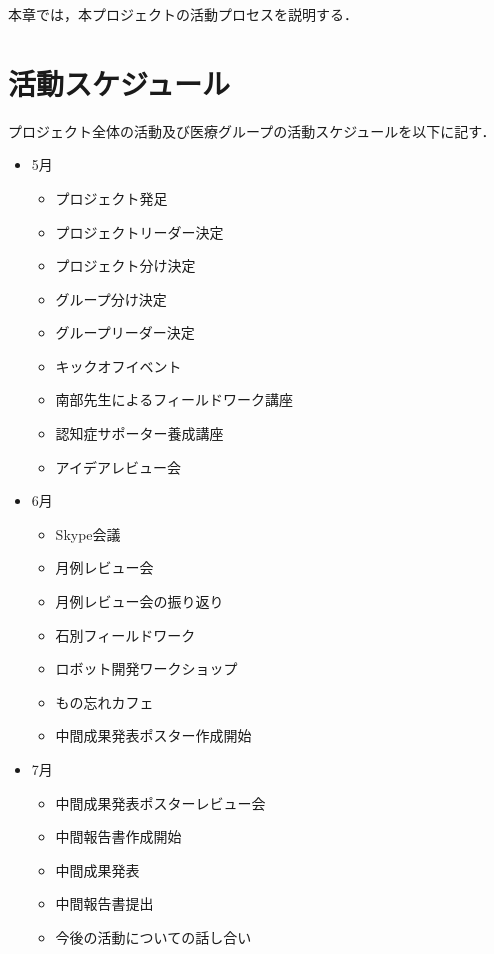 \documentclass[../report]{subfiles}
\begin{document}
本章では，本プロジェクトの活動プロセスを説明する．

\section{活動スケジュール}
プロジェクト全体の活動及び医療グループの活動スケジュールを以下に記す．
\begin{itemize}
    \item[] 5月
    \begin{itemize}
        \item プロジェクト発足
        \item プロジェクトリーダー決定
        \item プロジェクト分け決定
        \item グループ分け決定
        \item グループリーダー決定
        \item キックオフイベント
        \item 南部先生によるフィールドワーク講座
        \item 認知症サポーター養成講座
        \item アイデアレビュー会
    \end{itemize}
    \item[] 6月
    \begin{itemize}
        \item Skype会議
        \item 月例レビュー会
        \item 月例レビュー会の振り返り
        \item 石別フィールドワーク
        \item ロボット開発ワークショップ
        \item もの忘れカフェ
        \item 中間成果発表ポスター作成開始
    \end{itemize}
    \item[] 7月
    \begin{itemize}
        \item 中間成果発表ポスターレビュー会
        \item 中間報告書作成開始
        \item 中間成果発表
        \item 中間報告書提出
        \item 今後の活動についての話し合い
    \end{itemize}
\end{itemize}
\end{document}
